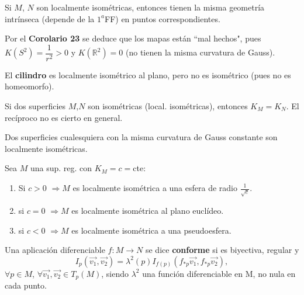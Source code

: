 \documentclass[twoside]{report}
\begin{document}
\begin{coro}
Si  $M$, $N$ son localmente isométricas, entonces tienen la misma geometría intrínseca (depende de la $1^a$FF) en puntos correspondientes.
%
\end{coro}

\begin{nota}
Por el \textbf{Corolario 23} se deduce que los mapas están ``mal hechos", pues $K(S^2)= \dfrac{1}{r^2} >0$ y $K(\mathbb{R}^2)=0$ (no tienen la misma curvatura de Gauss).
\end{nota}

\begin{ej}
El \textbf{cilindro} es localmente isométrico al plano, pero no es isométrico (pues no es homeomorfo).
\end{ej}

\begin{nota}
Si dos superficies $M$,$N$ son isométricas (local. isométricas), entonces $K_M = K_N$.
El recíproco no es cierto en general.
\end{nota}

\begin{teorema}
Dos superficies cualesquiera con la misma curvatura de Gauss constante son localmente isométricas.

\end{teorema}

\begin{coro}
Sea $M$ una sup. reg. con $K_M=c=$cte:
\begin{enumerate}
\item Si $c>0$ $\Rightarrow M$ es localmente isométrica a una esfera de radio $\frac{1}{\sqrt{c}}$.

\item si $c=0$ $\Rightarrow M$ es localmente isométrica al plano euclídeo.

\item si $c<0$ $\Rightarrow M$ es localmente isométrica a una pseudoesfera.

\end{enumerate}
\end{coro}

\begin{defi}
Una aplicación diferenciable $f: M \longrightarrow N$ se dice \textbf{conforme} si es biyectiva, regular y $$I_p (\overrightarrow{v_1},\overrightarrow{v_2}) = \lambda^2(p)I_{f(p)}(f_{*p}\overrightarrow{v_1},f_{*p}\overrightarrow{v_2}),$$ $\forall p \in M$, $\forall \overrightarrow{v_1},\overrightarrow{v_2} \in T_p(M)$, siendo $\lambda^2$ una función diferenciable en M, no nula en cada punto.
\end{defi}
\end{document}
